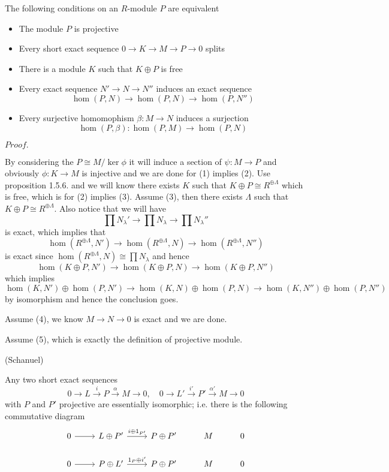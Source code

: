 \documentclass{article}
\newcommand{\Pf}[1]{$Proof.$\par}
\begin{document}
    \begin{theorem}
        The following conditions on an $R$-module $P$ are equivalent
        \begin{itemize}
            \item The module $P$ is projective
            \item Every short exact sequence $0\to K \to M \to P \to 0$ splits
            \item There is a module $K$ such that $K\oplus P$ is free
            \item Every exact sequence $N'\to N \to N''$ induces an exact sequence
            \[\hom(P,N) \to \hom(P,N) \to \hom(P,N'')\]
            \item Every surjective homomophism $\beta:M \to N$ induces a surjection
            \[\hom(P,\beta):\hom(P,M)\to \hom(P,N)\]
        \end{itemize}
    \end{theorem}
    \Pf\par
    By considering the $P\cong M/\ker \phi$ it will induce a section of $\psi:M\to P$ and obviously $\phi:K\to M$ is injective and we are done for (1) implies (2). Use proposition 1.5.6. and we will know there exists $K$ such that $K\oplus P \cong R^{\oplus \Lambda}$ which is free, which is for (2) implies (3). Assume (3), then there exists $\Lambda$ such that $K\oplus P \cong R^{\oplus \Lambda}$. Also notice that we will have
    \[\prod N_{\lambda}' \to \prod N_{\lambda} \to \prod N_{\lambda}''\]
    is exact, which implies that
    \[\hom(R^{\oplus \Lambda}, N') \to \hom(R^{\oplus \Lambda}, N) \to \hom(R^{\oplus \Lambda}, N'')\]
    is exact since $\hom(R^{\oplus \Lambda},N) \cong \prod N_{\lambda}$ and hence
    \[
    \hom(K\oplus P, N') \to \hom(K\oplus P, N) \to \hom(K\oplus P, N'')
    \]
    which implies
    \[
    \hom(K,N')\oplus\hom(P,N') \to \hom(K,N)\oplus\hom(P,N) \to \hom(K,N'')\oplus\hom(P,N'')
    \]
    by isomorphism and hence the conclusion goes.\par
    Assume (4), we know $M \to N \to 0$ is exact and we are done.\par
    Assume (5), which is exactly the definition of projective module.

    \begin{lemma}
        (Schanuel)\par
        Any two short exact sequences
        \[0\to L \overset{i}{\to} P \overset{\alpha}{\to} M \to 0,\quad 0 \to L' \overset{i'}{\to} P' \overset{\alpha'}{\to} M \to 0\]
        with $P$ and $P'$ projective are essentially isomorphic; i.e. there is the following commutative diagram
        \[
        \begin{tikzcd}
            0\arrow[r] & L\oplus P'\arrow[r,"i\oplus 1_{P'}"] & P\oplus P' & M & 0 \\
            0\arrow[r] & P\oplus L'\arrow[r,"1_P\oplus i'"] & P\oplus P' & M & 0
        \end{tikzcd}
        \]
    \end{lemma} 
    
\end{document}
